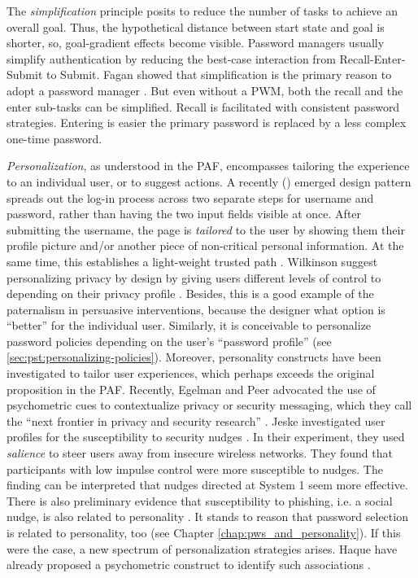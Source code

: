 	The \textit{simplification} principle posits to reduce the number of tasks to achieve an overall goal. Thus, the hypothetical distance between start state and goal is shorter, so, goal-gradient effects become visible. Password managers usually simplify authentication by reducing the best-case interaction from Recall-Enter-Submit to Submit. Fagan \etal showed that simplification is the primary reason to adopt a password manager \cite{Fagan2017UsersConsiderationsPWMs}. But even without a \gls{PWM}, both the recall and the enter sub-tasks can be simplified. Recall is facilitated with consistent password strategies. Entering is easier the primary password is replaced by a less complex one-time password. 
	
	\textit{Personalization}, as understood in the \gls{PAF}, encompasses tailoring the experience to an individual user, or to suggest actions. 
	A recently (\ar) emerged design pattern spreads out the log-in process across two separate steps for username and password, rather than having the two input fields visible at once. After submitting the username, the page is \textit{tailored} to the user by showing them their profile picture and/or another piece of non-critical personal information. At the same time, this establishes a light-weight trusted path \cite{Ye2005TrustedPaths}. Wilkinson \etal suggest personalizing privacy by design by giving users different levels of control to depending on their privacy profile \cite{Wilkinson2017UserTailoredPBD}. Besides, this is a good example of the paternalism in persuasive interventions, because the designer what option is ``better'' for the individual user. Similarly, it is conceivable to personalize password policies depending on the user's ``password profile'' (see \ref{sec:pst:personalizing-policies}). Moreover, personality constructs have been investigated to tailor user experiences, which perhaps exceeds the original proposition in the \gls{PAF}. Recently, Egelman and Peer advocated the use of psychometric cues to contextualize privacy or security messaging, which they call the ``next frontier in privacy and security research'' \cite{Egelman2015AverageUser}. Jeske \etal investigated user profiles for the susceptibility to security nudges \cite{Jeske2014NudgingWhomHow}. In their experiment, they used \textit{salience} to steer users away from insecure wireless networks. They found that participants with low impulse control were more susceptible to nudges. The finding can be interpreted that nudges directed at System 1 seem more effective. There is also preliminary evidence that susceptibility to phishing, i.e. a social nudge, is also related to personality \cite{Halevi2013PilotStudyPersonality}. It stands to reason that password selection is related to personality, too (see Chapter \ref{chap:pws_and_personality}). If this were the case, a new spectrum of personalization strategies arises. Haque \etal have already proposed a psychometric construct to identify such associations \cite{Haque2014PsychometricsStrongPassword}.
